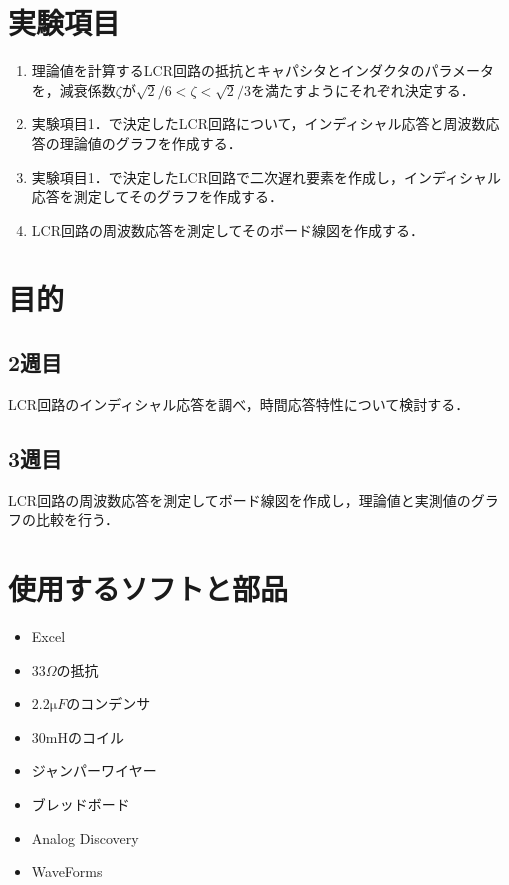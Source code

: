 \documentclass{jlreq}
\numberwithin{equation}{section}
\begin{document}
\tableofcontents
\clearpage

\section{実験項目}
\begin{enumerate}
  \item 理論値を計算するLCR回路の抵抗とキャパシタとインダクタのパラメータを，減衰係数$\zeta$が$\sqrt{2}/6 < \zeta < \sqrt{2}/3$を満たすようにそれぞれ決定する．
  \item 実験項目1．で決定したLCR回路について，インディシャル応答と周波数応答の理論値のグラフを作成する．
  \item 実験項目1．で決定したLCR回路で二次遅れ要素を作成し，インディシャル応答を測定してそのグラフを作成する．
  \item LCR回路の周波数応答を測定してそのボード線図を作成する．
\end{enumerate}

\section{目的}
\subsection{2週目}
LCR回路のインディシャル応答を調べ，時間応答特性について検討する．

\subsection{3週目}
LCR回路の周波数応答を測定してボード線図を作成し，理論値と実測値のグラフの比較を行う．

\section{使用するソフトと部品}
\begin{itemize}
  \item Excel
  \item $33\si{\Omega}$の抵抗
  \item $2.2\si{\micro F}$のコンデンサ
  \item $30\si{\milli\henry}$のコイル
  \item ジャンパーワイヤー
  \item ブレッドボード
  \item Analog Discovery
  \item WaveForms
\end{itemize}
\end{document}
